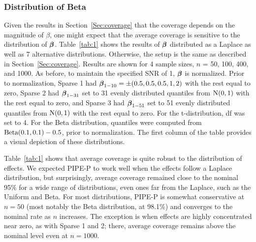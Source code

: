 \subsubsection{Distribution of Beta}
\label{Sec:distribution}

Given the results in Section~\ref{Sec:coverage} that the coverage depends on the magnitude of $\beta$, one might expect that the average coverage is sensitive to the distribution of $\bb$. Table~\ref{tab:1} shows the results of $\bb$ distributed as a Laplace as well as 7 alternative distributions. Otherwise, the setup is the same as described in Section~\ref{Sec:coverage}. Results are shown for 4 sample sizes, $n$ = 50, 100, 400, and 1000. As before, to maintain the specified SNR of 1, $\bb$ is normalized. Prior to normalization, Sparse 1 had $\boldsymbol{\beta}_{1-10} = \pm(0.5, 0.5, 0.5, 1, 2)$ with the rest equal to zero, Sparse 2 had $\boldsymbol{\beta}_{1-31}$ set to 31 evenly distributed quantiles from $\textrm{N}(0, 1)$ with the rest equal to zero, and Sparse 3 had $\boldsymbol{\beta}_{1-51}$ set to 51 evenly distributed quantiles from $\textrm{N}(0, 1)$ with the rest equal to zero. For the t-distribution, df was set to 4. For the Beta distribution, quantiles were computed from $\textrm{Beta}(0.1, 0.1) - 0.5$, prior to normalization. The first column of the table provides a visual depiction of these distributions.

Table~\ref{tab:1} shows that average coverage is quite robust to the distribution of effects. We expected PIPE-P to work well when the effects follow a Laplace distribution, but surprisingly, average coverage remained close to the nominal 95\% for a wide range of distributions, even ones far from the Laplace, such as the Uniform and Beta. For most distributions, PIPE-P is somewhat conservative at $n=50$ (most notably the Beta distribution, at 98.1\%) and converges to the nominal rate as $n$ increases. The exception is when effects are highly concentrated near zero, as with Sparse 1 and 2; there, average coverage remains above the nominal level even at $n=1000$.

\begin{table}[htb!]
  \centering
  
  \caption{\label{tab:1} Average coverages from the simulation in Section~\ref{Sec:distribution} examining the coverage behavior of PIPE-P intervals under various distributions for $\bb$ and various sample sizes. For each respective distribution, $\bb$ is set to $p = 101$ equally spaced quantiles and normalized s.t. SNR = 1. For each combination of distribution and sample size, 1000 datasets were generated. The nominal coverage rate is 95\%.}
\end{table}

